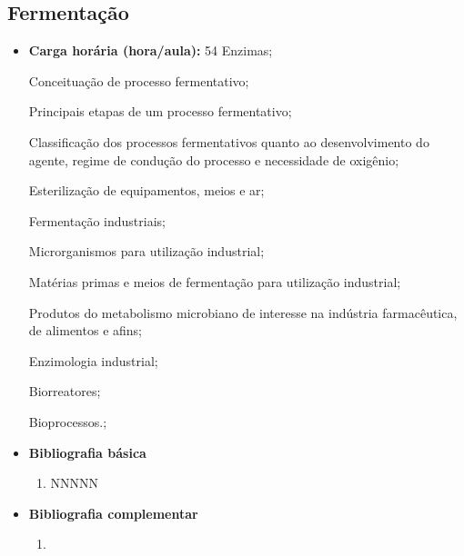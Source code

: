 \documentclass[11pt,fleqn]{book} %
\begin{document}
\subsection{Fermentação}\label{disc:fermentacao}
\begin{itemize}
	\item \textbf{Carga horária (hora/aula):} 54
	Enzimas;
	
	Conceituação de processo fermentativo; 
	
	Principais etapas de um processo fermentativo; 
	
	Classificação dos processos fermentativos quanto ao desenvolvimento do agente, regime de condução do processo e necessidade de oxigênio;
	
	Esterilização de equipamentos, meios e ar;
	
	Fermentação industriais;
	
	Microrganismos para utilização industrial; 
	
	Matérias primas e meios de fermentação para utilização industrial; 
	
	Produtos do metabolismo microbiano de interesse na indústria farmacêutica, de alimentos e afins; 
	
	Enzimologia industrial; 
	
	Biorreatores;
	
	Bioprocessos.;
	\item \textbf{Bibliografia básica}
	\begin{enumerate}
		\item NNNNN
	\end{enumerate}
	\item \textbf{Bibliografia complementar}
	\begin{enumerate}
		\item 
	\end{enumerate}	
\end{itemize}
\end{document}
